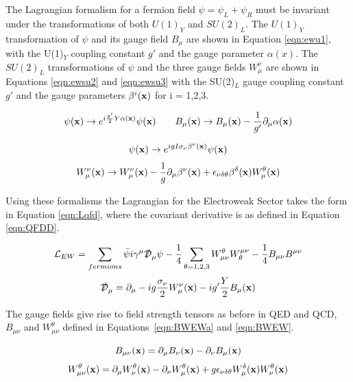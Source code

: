 The Lagrangian formalism for a fermion field $\psi = \psi_{L} + \psi_{R}$ must be invariant under the transformations of both $U(1)_{Y}$ and $SU(2)_{L}$. The $U(1)_{Y}$ transformation of $\psi$ and its gauge field $B_{\mu}$ are shown in Equation \ref{eqn:ewu1}, with the U(1)$_{Y}$ coupling constant $g'$ and the gauge parameter $\alpha(x)$. The $SU(2)_{L}$ transformations of $\psi$ and the three gauge fields $W^{\nu}_{\mu}$ are shown in Equations \ref{eqn:ewsu2} and \ref{eqn:ewsu3} with the SU(2)$_{L}$ gauge coupling constant $g'$ and the gauge parameters $\beta^{i}(\mathbf{x})$ for i = 1,2,3.

\begin{equation}
\psi(\mathbf{x}) \rightarrow e^{i\frac{g'}{2}Y\alpha (\mathbf{x})}\psi(\mathbf{x}) \qquad B_{\mu}(\mathbf{x}) \rightarrow B_{\mu}(\mathbf{x}) - \frac{1}{g'}\partial_{\mu}\alpha(\mathbf{x})
\label{eqn:ewu1}
\end{equation}

\begin{equation}
\psi(\mathbf{x}) \rightarrow e^{igI\sigma_{\nu} \beta^{\nu} (\mathbf{x})}\psi(\mathbf{x})
\label{eqn:ewsu2}
\end{equation}
\begin{equation}
W_{\mu}^{\nu}(\mathbf{x}) \rightarrow W_{\mu}^{\nu}(\mathbf{x}) - \frac{1}{g}\partial_{\mu}\beta^{\nu}(\mathbf{x}) + \epsilon_{\nu \delta \theta}\beta^{\delta}(\mathbf{x})W_{\mu}^{\theta}(\mathbf{x})
\label{eqn:ewsu3}
\end{equation}

Using these formalisms the Lagrangian for the Electroweak Sector takes the form in Equation \ref{eqn:Lqfd}, where the covariant derivative is as defined in Equation \ref{eqn:QFDD}. 

\begin{equation}
{\mathcal{L}}_{EW} = \sum_{fermions} \bar{\psi}i\gamma^{\mu}\slashed{\mathcal{D}}_{\mu}\psi - \frac{1}{4}\sum_{\theta = 1,2,3} W^{\theta}_{\mu\nu}W_{\theta}^{\mu\nu} - \frac{1}{4}B_{\mu\nu}B^{\mu\nu}
\label{eqn:Lqfd}
\end{equation}
\begin{equation}
\slashed{\mathcal{D}}_{\mu} = \partial_{\mu}-ig\frac{\sigma_{\nu}}{2}W_{\mu}^{\nu}(\mathbf{x}) - ig'\frac{Y}{2}B_{\mu}(\mathbf{x})
\label{eqn:QFDD}
\end{equation}

The gauge fields give rise to field strength tensors as before in QED and QCD, $B_{\mu\nu}$ and $W_{\mu\nu}^{\theta}$ defined in Equations~\ref{eqn:BWEWa} and \ref{eqn:BWEW}. 

\begin{equation}
B_{\mu\nu}(\mathbf{x}) = \partial_{\mu}B_{\nu}(\mathbf{x}) - \partial_{\nu}B_{\mu}(\mathbf{x})
\label{eqn:BWEWa}
\end{equation}
\begin{equation}
W_{\mu\nu}^{\theta}(\mathbf{x}) = \partial_{\mu}W_{\nu}^{\theta}(\mathbf{x}) - \partial_{\nu}W_{\mu}^{\theta}(\mathbf{x}) + g\epsilon_{\nu \delta \theta}W_{\mu}^{\delta}(\mathbf{x})W_{\nu}^{\theta}(\mathbf{x})
\label{eqn:BWEW}
\end{equation}

